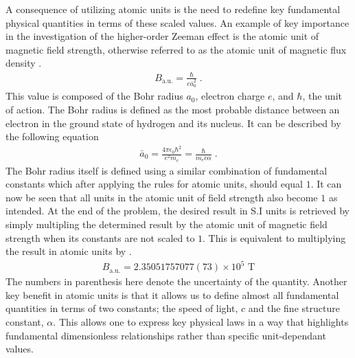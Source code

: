         A consequence of utilizing atomic units is the need to redefine key fundamental physical quantities in terms of these scaled values. An example of key importance in the investigation of the higher-order Zeeman effect is the atomic unit of magnetic field strength, otherwise referred to as the atomic unit of magnetic flux density \cite{Mohr_Newell_Taylor_Tiesinga_2024}.
        \begin{align}
            B_{\text{a.u.}} = \frac{\hbar}{e \bar{a}_0^2}\;.\label{eq:B_au}
        \end{align}
        \noindent This value is composed of the Bohr radius $a_0$, electron charge $e$, and $\hbar$, the unit of action. The Bohr radius is defined as the most probable distance between an electron in the ground state of hydrogen and its nucleus. It can be described by the following equation \cite{Griffiths_2018}
        \begin{align}
            \bar{a}_0 = \frac{4\pi \epsilon_0 \hbar^2}{e^2 m_e} = \frac{\hbar}{m_e c \alpha} \label{eq:bohr_radius}\;.
        \end{align}
        \noindent The Bohr radius itself is defined using a similar combination of fundamental constants which after applying the rules for atomic units, should equal $1$. It can now be seen that all units in the atomic unit of field strength also become $1$ as intended. At the end of the problem, the desired result in S.I units is retrieved by simply multipling the determined result by the atomic unit of magnetic field strength when its constants are not scaled to $1$. This is equivalent to multiplying the result in atomic units by \cite{Mohr_Newell_Taylor_Tiesinga_2024}.
        \begin{align}
            B_{\text{a.u.}} = 2.35051757077(73) \times 10^5 \text{ T}
        \end{align}
        \noindent The numbers in parenthesis here denote the uncertainty of the quantity. Another key benefit in atomic units is that it allows us to define almost all fundamental quantities in terms of two constants; the speed of light, $c$ and the fine structure constant, $\alpha$. This allows one to express key physical laws in a way that highlights fundamental dimensionless relationships rather than specific unit-dependant values.\\

